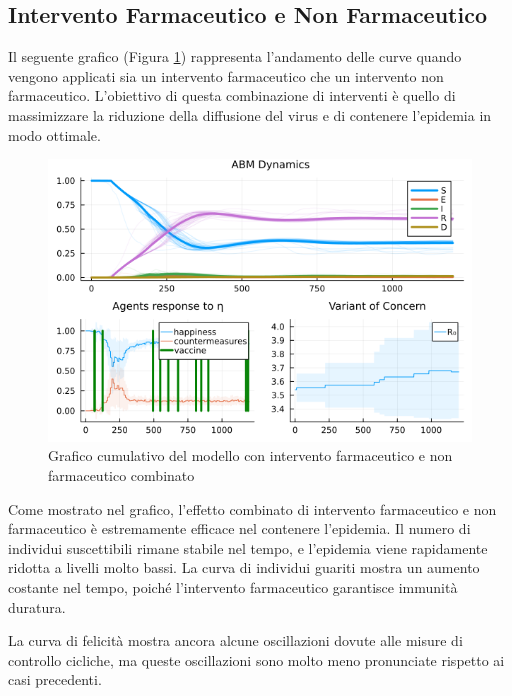 \subsection{Intervento Farmaceutico e Non Farmaceutico}

Il seguente grafico (Figura \ref{fig:abm_combined_intervent}) 
rappresenta l'andamento delle curve quando vengono applicati sia 
un intervento farmaceutico che un intervento non farmaceutico. 
L'obiettivo di questa combinazione di interventi è quello di 
massimizzare la riduzione della diffusione del virus e di contenere 
l'epidemia in modo ottimale.

\begin{figure}[H]
    \begin{center}
		\includegraphics[width=\textwidth]{img/SocialNetworkABM_ALL.png}
		\caption{Grafico cumulativo del modello con intervento farmaceutico e non farmaceutico combinato}
		\label{fig:abm_combined_intervent}
	\end{center}
\end{figure}

Come mostrato nel grafico, l'effetto combinato di intervento 
farmaceutico e non farmaceutico è estremamente efficace nel 
contenere l'epidemia. Il numero di individui suscettibili 
rimane stabile nel tempo, e l'epidemia viene rapidamente ridotta 
a livelli molto bassi. La curva di individui guariti mostra un 
aumento costante nel tempo, poiché l'intervento farmaceutico 
garantisce immunità duratura.

La curva di felicità mostra ancora alcune oscillazioni dovute 
alle misure di controllo cicliche, ma queste oscillazioni sono 
molto meno pronunciate rispetto ai casi precedenti.

